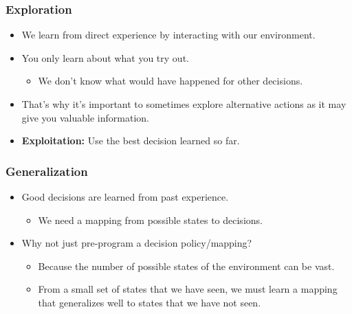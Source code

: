 \subsubsection{Exploration}
\begin{summary}
    \begin{itemize}
        \item We learn from direct experience by interacting with our environment.
        \item You only learn about what you try out.
        \begin{itemize}
            \item We don’t know what would have happened for other decisions.
        \end{itemize}
        \item That's why it's important to sometimes explore alternative actions as it may give you valuable information.
        \item \textbf{Exploitation:} Use the best decision learned so far.
    \end{itemize}
\end{summary}

\subsubsection{Generalization}
\begin{summary}
    \begin{itemize}
        \item Good decisions are learned from past experience.
        \begin{itemize}
            \item We need a mapping from possible states to decisions.
        \end{itemize}
        \item Why not just pre-program a decision policy/mapping?
        \begin{itemize}
            \item Because the number of possible states of the environment can be vast.
            \item From a small set of states that we have seen, we must learn a mapping that generalizes well to states that we have not seen.
        \end{itemize}
    \end{itemize}
\end{summary}

